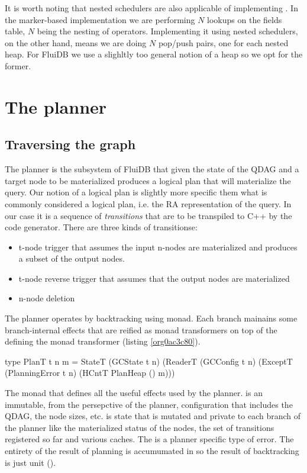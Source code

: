It is worth noting that nested schedulers are also applicable of
implementing \hask{<//>}. In the marker-based implementation we are
performing \(N\) lookups on the fields table, \(N\) being the nesting
of \hask{<//>} operators. Implementing it using nested schedulers, on the
other hand, means we are doing \(N\) pop/push pairs, one for each
nested heap. For FluiDB we use a slighltly too general notion of a
heap so we opt for the former.
\section{The planner}
\label{sec:org3e22e01}

\subsection{Traversing the graph}
\label{sec:orgad5ab39}
The planner is the subsystem of FluiDB that given the state of the
QDAG and a target node to be materialized produces a logical plan that
will materialize the query.  Our notion of a logical plan is slightly
more specific them what is commonly considered a logical plan,
i.e. the RA representation of the query. In our case it is a sequence
of \emph{transitions} that are to be transpiled to C++ by the code
generator. There are three kinds of transitionse:

\begin{itemize}
\item t-node trigger that assumes the input n-nodes are materialized and
produces a subset of the output nodes.
\item t-node reverse trigger that assumes that the output nodes are materialized
\item n-node deletion
\end{itemize}

The planner operates by backtracking using  monad. Each branch
mainains some branch-internal effects that are reified as monad
transformers on top of the  defining the  monad
transformer (listing \ref{org0ac3c80}).

\begin{code}
\begin{haskellcode}
type PlanT t n m =
  StateT
    (GCState t n)
    (ReaderT (GCConfig t n)
     (ExceptT (PlanningError t n)
      (HCntT PlanHeap () m)))
\end{haskellcode}
\caption{\label{org0ac3c80}The monad that defines all the useful effects used by the planner.  is an immutable, from the persepctive of the planner, configuration that includes the QDAG, the node sizes, etc.  is state that is mutated and private to each branch of the planner like the materialized status of the nodes, the set of transitions registered so far and various caches. The  is a planner specific type of error. The entirety of the result of planning is accumumated in  so the result of backtracking is just unit (\hask{()}).}
\end{code}

